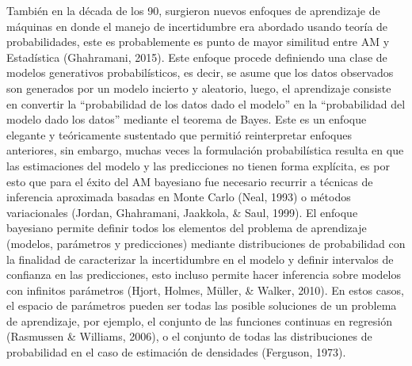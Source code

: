 También en la década de los 90, surgieron nuevos enfoques de aprendizaje de máquinas en donde el manejo de incertidumbre era abordado usando teoría de probabilidades, este es probablemente es punto de mayor similitud entre AM y Estadística (Ghahramani, 2015). Este enfoque procede definiendo una clase de modelos generativos probabilísticos, es decir, se asume que los datos observados son generados por un modelo incierto y aleatorio, luego, el aprendizaje consiste en convertir la “probabilidad de los datos dado el modelo” en la “probabilidad del modelo dado los datos” mediante el teorema de Bayes. Este es un enfoque elegante y teóricamente sustentado que permitió reinterpretar enfoques anteriores, sin embargo, muchas veces la formulación probabilística resulta en que las estimaciones del modelo y las predicciones no tienen forma explícita, es por esto que para el éxito del AM bayesiano fue necesario recurrir a técnicas de inferencia aproximada basadas en Monte Carlo (Neal, 1993) o métodos variacionales (Jordan, Ghahramani, Jaakkola, \& Saul, 1999). El enfoque bayesiano permite definir todos los elementos del problema de aprendizaje (modelos, parámetros y predicciones) mediante distribuciones de probabilidad con la finalidad de caracterizar la incertidumbre en el modelo y definir intervalos de confianza en las predicciones, esto incluso permite hacer inferencia sobre modelos con infinitos parámetros (Hjort, Holmes, Müller, \& Walker, 2010). En estos casos, el espacio de parámetros pueden ser todas las posible soluciones de un problema de aprendizaje, por ejemplo, el conjunto de las funciones continuas en regresión (Rasmussen \& Williams, 2006), o el conjunto de todas las distribuciones de probabilidad en el caso de estimación de densidades (Ferguson, 1973).

